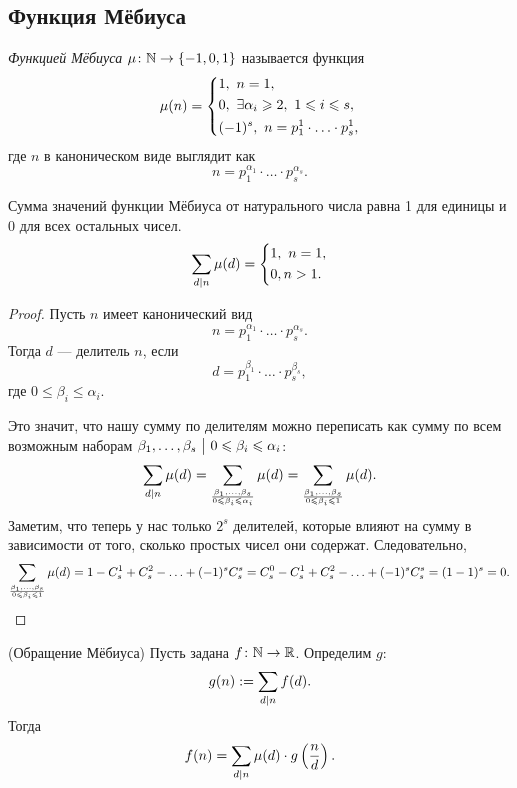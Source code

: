 \subsection{Функция Мёбиуса}

\begin{definition}
	\textit{Функцией Мёбиуса} $\mu \colon \mathbb{N} \rightarrow \{-1, 0, 1\}$ называется функция
	\[
		\mu(n) = \left\{\begin{aligned}
			&{1,\ n = 1,}
			\\
			&{0,\ \exists \alpha_i \geqslant 2,\ 1 \leqslant i \leqslant s,}
			\\
			&{(-1)^s,\ n = p_1^1 \cdot \ldots \cdot p_s^1,}
		\end{aligned}\right.
	\]
	где $n$ в каноническом виде выглядит как
	\[
		n = p_1^{\alpha_1} \cdot \ldots \cdot p_s^{\alpha_s}.
	\]
\end{definition}

\begin{lemma}
	Сумма значений функции Мёбиуса от натурального числа равна 1 для единицы и 0 для всех остальных чисел.
	\[
		\sum\limits_{d \mid n} \mu(d) = \left\{\begin{aligned}
			&{1,\ n = 1,}
			\\
			&{0, n > 1.}
		\end{aligned}\right.
	\]
\end{lemma}

\begin{proof}
	Пусть $n$ имеет канонический вид
	\[
		n = p_1^{\alpha_1} \cdot \ldots \cdot p_s^{\alpha_s}.
	\]
	Тогда $d$ --- делитель $n$, если
	\[
		d = p_1^{\beta_1} \cdot \ldots \cdot p_s^{\beta_s},
	\]
	где $0 \le \beta_i \le \alpha_i$.
	
	Это значит, что нашу сумму по делителям можно переписать как сумму по всем возможным наборам $\beta_1, \ldots, \beta_s \ \big|\  0 \leqslant \beta_i \leqslant \alpha_i$:
	\[
		\sum\limits_{d \mid n} \mu(d) = \sum\limits_{\beta_1, \ldots, \beta_s \over 0 \leqslant \beta_i \leqslant \alpha_i} \mu(d) = \sum\limits_{\beta_1, \ldots, \beta_s \over 0 \leqslant \beta_i \leqslant 1} \mu(d).
	\]
	Заметим, что теперь у нас только $2^s$ делителей, которые влияют на сумму в зависимости от того, сколько простых чисел они содержат. Следовательно,
	\[
		\sum\limits_{\beta_1, \ldots, \beta_s \over 0 \leqslant \beta_i \leqslant 1} \mu(d) = 1 - C_s^1 + C_s^2 - \ldots + (-1)^s C_s^s = \\
		C_s^0 - C_s^1 + C_s^2 - \ldots + (-1)^s C_s^s = (1 - 1)^s = 0.
	\]
\end{proof}

\begin{theorem} (Обращение Мёбиуса)
	Пусть задана $f \colon \mathbb{N} \rightarrow \mathbb{R}$. Определим $g$:
	\[
		g(n) := \sum\limits_{d \mid n} f(d).
	\]
	Тогда
	\[
		f(n) = \sum\limits_{d \mid n} \mu(d) \cdot g\left(\frac{n}{d}\right).
	\]
\end{theorem}

